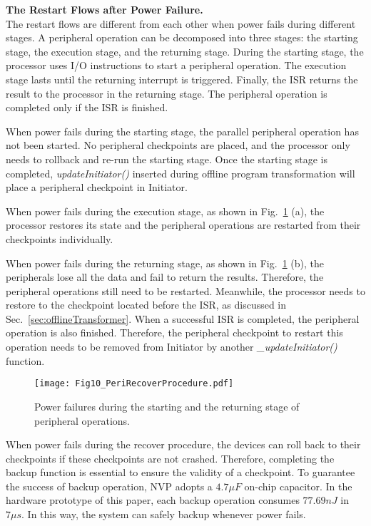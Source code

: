 \vspace{5pt}
\noindent\textbf{The Restart Flows after Power Failure.} \\
The restart flows are different from each other when power fails during different stages.
A peripheral operation can be decomposed into three stages: the starting stage, the execution stage, and the returning stage.
During the starting stage, the processor uses I/O instructions to start a peripheral operation.
The execution stage lasts until the returning interrupt is triggered.
Finally, the ISR returns the result to the processor in the returning stage.
The peripheral operation is completed only if the ISR is finished.

%
When power fails during the starting stage, the parallel peripheral operation has not been started.
No peripheral checkpoints are placed, and the processor only needs to rollback and re-run the starting stage.
Once the starting stage is completed, \emph{updateInitiator()} inserted during offline program transformation will place a peripheral checkpoint in Initiator.

When power fails during the execution stage, as shown in Fig.~\ref{fig:PeriRecoverProcedure} (a), the processor restores its state and the peripheral operations are restarted from their checkpoints individually.

When power fails during the returning stage, as shown in Fig.~\ref{fig:PeriRecoverProcedure} (b), the peripherals lose all the data and fail to return the results.
Therefore, the peripheral operations still need to be restarted.
Meanwhile, the processor needs to restore to the checkpoint located before the ISR, as discussed in Sec.~\ref{sec:offlineTransformer}.
When a successful ISR is completed, the peripheral operation is also finished.
Therefore, the peripheral checkpoint to restart this operation needs to be removed from Initiator by another \emph{\_updateInitiator()} function.

%
\begin{figure}[t]
    \centering
    \texttt{[image: Fig10\_PeriRecoverProcedure.pdf]}
    \vspace{-5pt}
    \caption{Power failures during the starting and the returning stage of peripheral operations.}
    \vspace{-5pt}
    \label{fig:PeriRecoverProcedure}
\end{figure}

When power fails during the recover procedure, the devices can roll back to their checkpoints if these checkpoints are not crashed.
Therefore, completing the backup function is essential to ensure the validity of a checkpoint.
To guarantee the success of backup operation, NVP adopts a $4.7 \mu F$ on-chip capacitor.
In the hardware prototype of this paper, each backup operation consumes $77.69nJ$ in $7 \mu s$.
In this way, the system can safely backup whenever power fails.

